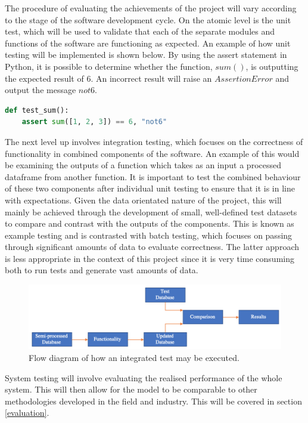 \documentclass[10pt,onecolumn,letterpaper]{article}
\begin{document}
The procedure of evaluating the achievements of the project will vary according to the stage of the software development cycle. On the atomic level is the unit test, which will be used to validate that each of the separate modules and functions of the software are functioning as expected. An example\cite{python_testing} of how unit testing will be implemented is shown below. By using the assert statement in Python, it is possible to determine whether the function, $sum()$, is outputting the expected result of $6$. An incorrect result will raise an $AssertionError$ and output the message $not6$.

\begin{lstlisting}[language=Python, caption=Example Test.]
def test_sum():
    assert sum([1, 2, 3]) == 6, "not6"
\end{lstlisting} 

The next level up involves integration testing, which focuses on the correctness of functionality in combined components of the software. An example of this would be examining the outputs of a function which takes as an input a processed dataframe from another function. It is important to test the combined behaviour of these two components after individual unit testing to ensure that it is in line with expectations. Given the data orientated nature of the project, this will mainly be achieved through the development of small, well-defined test datasets to compare and contrast with the outputs of the components. This is known as example testing and is contrasted with batch testing, which focuses on passing through significant amounts of data to evaluate correctness. The latter approach is less appropriate in the context of this project since it is very time consuming both to run tests and generate vast amounts of data.

\begin{figure}[!hbt!]
\centering
\includegraphics[width=16.5cm]{integrated_testing.png}
\caption{Flow diagram of how an integrated test may be executed.}
\end{figure}

System testing will involve evaluating the realised performance of the whole system. This will then allow for the model to be comparable to other methodologies developed in the field and industry. This will be covered in section \ref{evaluation}.
\end{document}
